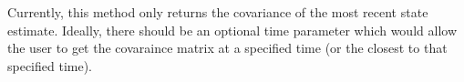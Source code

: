 
\begin{DoxyRefList}
\item[\label{todo__todo000001}%
\hypertarget{todo__todo000001}{}%
Member \hyperlink{classSubStates_1_1SubState_a4d863939fdb98b2739e1e737ec7496ae}{Sub\+States.Sub\+State.covariance} (self)]Currently, this method only returns the covariance of the most recent state estimate. Ideally, there should be an optional time parameter which would allow the user to get the covaraince matrix at a specified time (or the closest to that specified time).
\end{DoxyRefList}